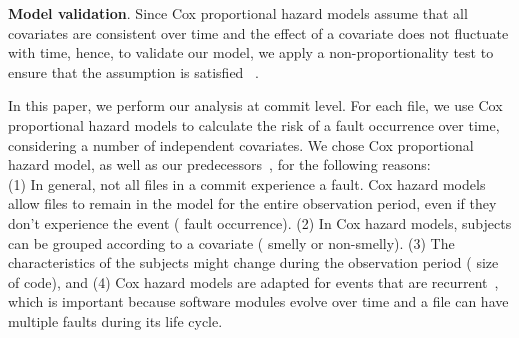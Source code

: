 \textbf{Model validation}. Since Cox proportional hazard models assume that all covariates are consistent over time and the effect of a covariate does not fluctuate with time, hence, to validate our model, we apply a non-proportionality test to ensure that the assumption is satisfied~\cite{therneau2000modeling} \cite{selim2010studying}.

In this paper, we perform our analysis at commit level. For each file, we use Cox proportional hazard models to calculate the risk of a fault occurrence over time, considering a number of independent covariates. We chose Cox proportional hazard model, {\color{blue}as well as our predecessors~\cite{saboury2017empirical},} for the following reasons:\\
(1) In general, not all files in a commit experience a fault. Cox hazard models allow files to remain in the model for the entire observation period, even if they don't experience the event (\ie{} fault occurrence). (2) In Cox hazard models, subjects can be grouped according to a covariate (\eg{} smelly or non-smelly). (3) The characteristics of the subjects might change during the observation period (\eg{} size of code), and (4) Cox hazard models are adapted for events that are recurrent~\cite{therneau2000modeling}, which is important because software modules evolve over time and a file can have multiple faults during its life cycle. 